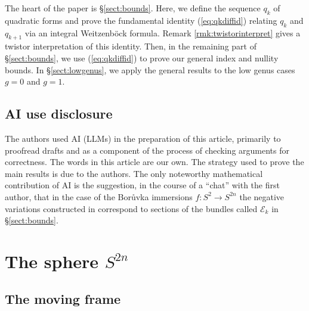 \documentclass[11pt]{article}
\theoremstyle{definition}
\numberwithin{equation}{section}
\begin{document}
The heart of the paper is \S\ref{sect:bounds}. Here, we define the sequence $q_k$ of quadratic forms and prove the fundamental identity (\ref{eq:qkdiffid}) relating $q_k$ and $q_{k+1}$ via an integral Weitzenb\"ock formula. Remark \ref{rmk:twistorinterpret} gives a twistor interpretation of this identity. Then, in the remaining part of \S\ref{sect:bounds}, we use (\ref{eq:qkdiffid}) to prove our general index and nullity bounds. In \S\ref{sect:lowgenus}, we apply the general results to the low genus cases $g = 0$ and $g=1.$

\subsection*{AI use disclosure}

The authors used AI (LLMs) in the preparation of this article, primarily to proofread drafts and as a component of the process of checking arguments for correctness. The words in this article are our own. The strategy used to prove the main results is due to the authors. The only noteworthy mathematical contribution of AI is the suggestion, in the course of a ``chat'' with the first author, that in the case of the Bor\r{u}vka immersions $f : S^2 \to S^{2n}$ the negative variations constructed in \cite{BallMadnick26} correspond to sections of the bundles called $\mathcal{E}_k$ in \S\ref{sect:bounds}.
	
\section{The sphere $S^{2n}$}\label{sect:thesphere}
	
\subsection{The moving frame}
	
\end{document}
